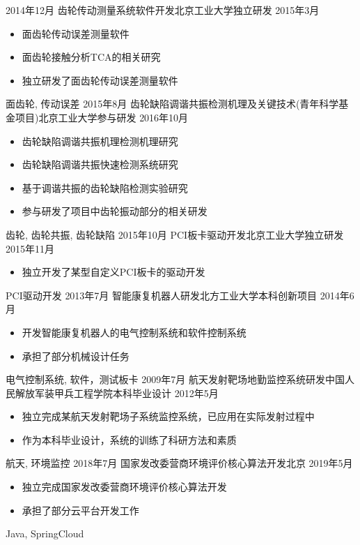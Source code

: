 \begin{experiences}
  \emptySeparator
  \experience
  {2014年12月} {齿轮传动测量系统软件开发}{北京工业大学}{独立研发}
  {2015年3月}    {
    \begin{itemize}
      \item 面齿轮传动误差测量软件
      \item 面齿轮接触分析TCA的相关研究
      \item 独立研发了面齿轮传动误差测量软件
    \end{itemize}
  }
  {面齿轮, 传动误差}
  \emptySeparator
  \experience
  {2015年8月} {齿轮缺陷调谐共振检测机理及关键技术(青年科学基金项目)}{北京工业大学}{参与研发}
  {2016年10月}    {
    \begin{itemize}
      \item 齿轮缺陷调谐共振机理检测机理研究
      \item 齿轮缺陷调谐共振快速检测系统研究
      \item 基于调谐共振的齿轮缺陷检测实验研究
      \item 参与研发了项目中齿轮振动部分的相关研发
    \end{itemize}
  }
  {齿轮, 齿轮共振, 齿轮缺陷}
  \emptySeparator
  \experience
  {2015年10月} {PCI板卡驱动开发}{北京工业大学}{独立研发}
  {2015年11月}    {
    \begin{itemize}
      \item 独立开发了某型自定义PCI板卡的驱动开发
    \end{itemize}
  }
  {PCI驱动开发}
  \emptySeparator
  \experience
  {2013年7月} {智能康复机器人研发}{北方工业大学}{本科创新项目}
  {2014年6月}    {
    \begin{itemize}
      \item 开发智能康复机器人的电气控制系统和软件控制系统
      \item 承担了部分机械设计任务
    \end{itemize}
  }
  {电气控制系统, 软件，测试板卡}
  \emptySeparator
  \experience
  {2009年7月} {航天发射靶场地勤监控系统研发}{中国人民解放军装甲兵工程学院}{本科毕业设计}
  {2012年5月}    {
    \begin{itemize}
      \item 独立完成某航天发射靶场子系统监控系统，已应用在实际发射过程中
      \item 作为本科毕业设计，系统的训练了科研方法和素质
    \end{itemize}
  }
  {航天, 环境监控}
  \emptySeparator
  \experience
  {2018年7月} {国家发改委营商环境评价核心算法开发}{北京}{}
  {2019年5月}    {
    \begin{itemize}
      \item 独立完成国家发改委营商环境评价核心算法开发
      \item 承担了部分云平台开发工作
    \end{itemize}
  }
  {Java, SpringCloud}

\end{experiences}
